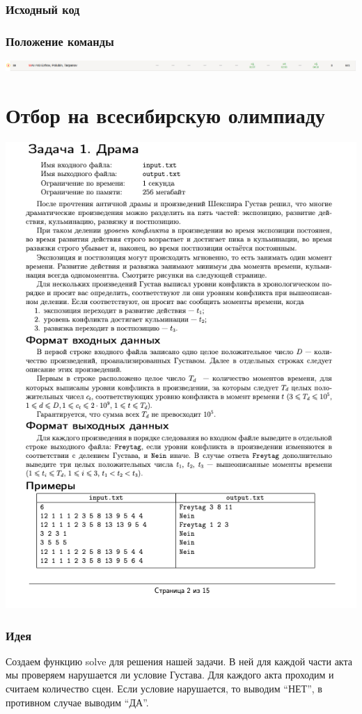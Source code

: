 \documentclass[12pt]{article}
\begin{document}
\subsubsection*{Исходный код}

\subsubsection*{Положение команды}
\includegraphics[scale=0.45]{images/3.png}\newline\noindent

\pagebreak
\section{Отбор на всесибирскую олимпиаду}
\includegraphics[scale=0.75]{statements/Vsesib.png}
\subsubsection*{Идея}
Создаем функцию solve для решения нашей задачи. В ней для каждой части акта мы проверяем нарушается ли условие Густава. Для каждого акта проходим и считаем количество сцен. 
Если условие нарушается, то выводим “НЕТ”, в противном случае выводим “ДА”.
\\ 
\end{document}
